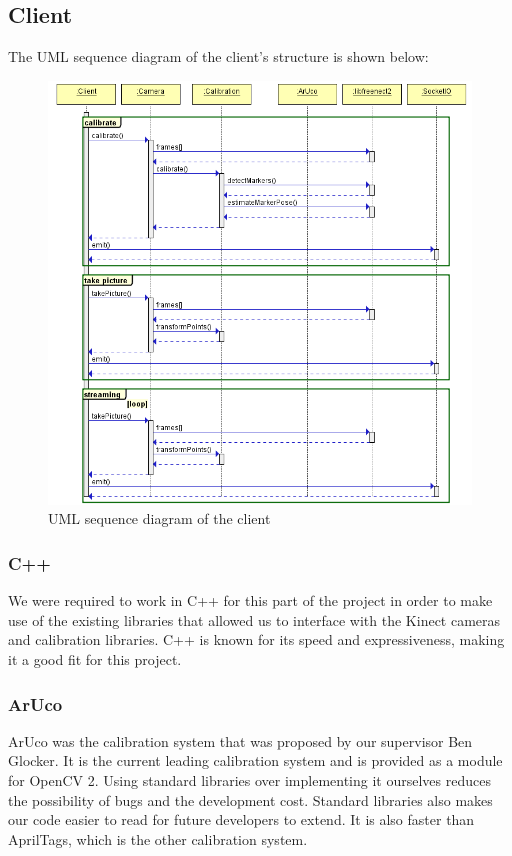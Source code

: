 \documentclass{article}
\begin{document}
\subsection{Client}
The UML sequence diagram of the client's structure is shown below:
\begin{figure}[h]
  \centering
  \includegraphics[scale=0.6]{clientUML}
  \caption{UML sequence diagram of the client}
\end{figure}
\subsubsection{C++}
We were required to work in C++ for this part of the project in order to make use of the existing libraries that allowed us to interface with the Kinect cameras and calibration libraries. C++ is known for its speed and expressiveness, making it a good fit for this project. 
\subsubsection{ArUco}
ArUco was the calibration system that was proposed by our supervisor Ben Glocker. It is the current leading calibration system and is provided as a module for OpenCV 2. Using standard libraries over implementing it ourselves reduces the possibility of bugs and the development cost. Standard libraries also makes our code easier to read for future developers to extend. It is also faster than AprilTags, which is the other calibration system.
\end{document}
